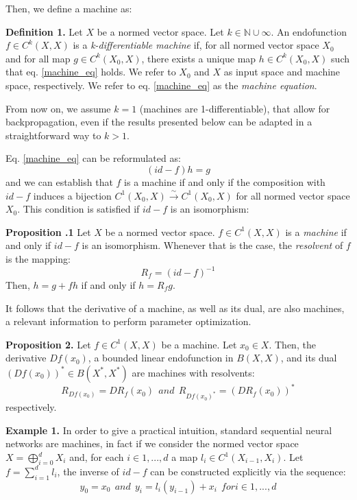Then, we define a machine as:

\textbf{Definition 1.}  Let $X$ be a normed vector space. Let $k \in \mathbb{N} \cup {{\infty}}$. An endofunction $f \in C^k(X,X)$ is a \textit{k-differentiable machine} if, for all normed vector space $X_0$ and
for all map $g \in C^k(X_0, X)$, there exists a unique map $h \in C^k(X_0,X)$ such that eq. \ref{machine_eq} holds. We refer to $X_0$ and $X$ as input space and machine space, respectively.
We refer to eq. \ref{machine_eq} as the \textit{machine equation}.

From now on, we assume $k=1$ (machines are 1-differentiable), that allow for backpropagation, even if the results presented below can be adapted in a straightforward way to $k>1$.

Eq. \ref{machine_eq} can be reformulated as:
\begin{equation}
    (id-f)h = g
\end{equation}
and we can establish that $f$ is a machine if and only if the composition with $id-f$ induces a bijection $C^1(X_0,X) \xrightarrow{\sim} C^1(X_0,X)$ for all normed vector space $X_0$. This condition is satisfied if $id-f$ is an isomorphism:


\textbf{Proposition .1} Let $X$ be a normed vector space. $f \in C^1(X,X)$ is a \textit{machine} if and only if $id - f$ is an isomorphism. Whenever that is the case, the \textit{resolvent} of $f$ is the mapping:
\begin{equation}
    R_f = (id-f)^{-1}
\end{equation}
Then, $h = g+fh$ if and only if $h=R_fg$.

It follows that the derivative of a machine, as well as its dual, are also machines, a relevant information to perform parameter optimization.

\textbf{Proposition 2.} Let $f \in C^1(X,X)$ be a machine. Let $x_0 \in X$. Then, the derivative $Df(x_0)$, a bounded linear endofunction in $B(X,X)$, and its dual $(Df(x_0))^{*} \in B(X^*, X^*)$ are machines with resolvents:
\begin{equation*}
    R_{Df(x_0)} = DR_f(x_0) \ \ and \ \ R_{{Df(x_0)}^*} = (DR_f(x_0))^*
\end{equation*}
respectively.

\textbf{Example 1.} In order to give a practical intuition, standard sequential neural networks are machines, in fact if we consider the normed vector space $X = \bigoplus_{i=0}^{d} X_i$ and, for each $i \in {1,...,d}$ a map $l_i \in C^1(X_{i-1}, X_i)$. Let $f = \sum_{i=1}^d l_i$, the inverse of $id-f$ can be constructed explicitly via the sequence:
\begin{equation*}
    y_0 = x_0 \ \ and \ \ y_i = l_i(y_{i-1}) + x_i \ \ for i \in {1,...,d}
\end{equation*}


